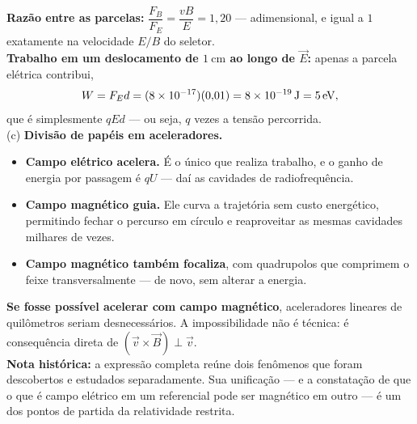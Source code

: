 \begin{questao}[4]{}
{\textbf{Razão entre as parcelas:}
$\dfrac{F_B}{F_E}=\dfrac{vB}{E}=1{,}20$ --- adimensional, e igual a $1$
exatamente na velocidade $E/B$ do seletor.\\
\textbf{Trabalho em um deslocamento de $\SI{1}{\centi\meter}$ ao longo de
$\vec E$:} apenas a parcela elétrica contribui,
\[
W=F_E d=(8\times 10^{-17})(0{,}01)=8\times 10^{-19}\,\si{\joule}=\SI{5}{\electronvolt},
\]
que é simplesmente $qEd$ --- ou seja, $q$ vezes a tensão percorrida.\\
(c) \textbf{Divisão de papéis em aceleradores.}
\begin{itemize}
\item \textbf{Campo elétrico acelera.} É o único que realiza trabalho, e o ganho
de energia por passagem é $qU$ --- daí as cavidades de radiofrequência.
\item \textbf{Campo magnético guia.} Ele curva a trajetória sem custo
energético, permitindo fechar o percurso em círculo e reaproveitar as mesmas
cavidades milhares de vezes.
\item \textbf{Campo magnético também focaliza}, com quadrupolos que comprimem o
feixe transversalmente --- de novo, sem alterar a energia.
\end{itemize}
\textbf{Se fosse possível acelerar com campo magnético}, aceleradores lineares
de quilômetros seriam desnecessários. A impossibilidade não é técnica: é
consequência direta de $\left(\vec v\times\vec B\right)\perp\vec v$.\\
\textbf{Nota histórica:} a expressão completa reúne dois fenômenos que foram
descobertos e estudados separadamente. Sua unificação --- e a constatação de que
o que é campo elétrico em um referencial pode ser magnético em outro --- é um
dos pontos de partida da relatividade restrita.}
\end{questao}

